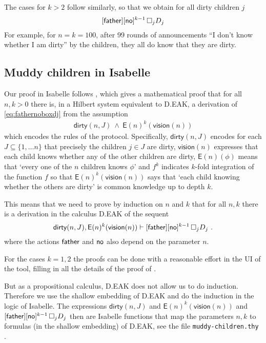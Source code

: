 \documentclass[runningheads,a4paper]{llncs}
\begin{document}
\medskip\noindent The cases for $k>2$ follow similarly, so that we obtain for all dirty children $j$
\begin{equation}\label{eq:fathernoboxdj}
[\textsf{father}][\textsf{no}]^{k-1}\,\Box_j D_j
 \end{equation}
For example, for $n=k=100$, after 99 rounds of announcements  ``I don't know whether I am dirty'' by the children, they all do know that they are dirty. 

\subsection{Muddy children in Isabelle}
Our proof in Isabelle follows \cite[Prop.24]{MaPS14}, which gives a mathematical proof that for all $n,k>0$ there is, in a Hilbert system equivalent to D.EAK, a derivation  of 
\eqref{eq:fathernoboxdj} from the assumption
\newcommand{\dirty}{\textsf{dirty}}
\newcommand{\E}{\textsf{E}}
\newcommand{\vision}{\textsf{vision}}
\begin{gather}\label{eq:mc-assumptions}
\dirty(n,J) \ \wedge \ \E(n)^k(\vision(n))
\end{gather}
which encodes the rules of the protocol. Specifically, $\dirty(n,J)$ encodes for each $J\subseteq\{1,\ldots n\}$ that precisely the children $j\in J$ are dirty, $\vision(n)$ expresses that each child knows whether any of the other children are dirty, 
$\E(n)(\phi)$ means that `every one of the $n$ children knows $\phi$' and $f^k$ indicates $k$-fold integration of the function $f$ so that $\E(n)^k(\vision(n))$ says that `each child knowing whether the others are dirty' is common knowledge up to depth $k$.

\medskip\noindent This means that we need to prove by induction on $n$ and $k$ that for  all $n,k$ there is a derivation in the calculus D.EAK of the sequent 
\begin{equation}\label{eq:mc}
 \dirty(n,J) , \E(n)^k(\vision(n))\vdash [\father][\no]^{k-1}\,\Box_j D_j \ .
 \end{equation}
where the actions $\textsf{father}$ and $\textsf{no}$ also depend on the parameter $n$.

\medskip\noindent For the cases $k=1,2$ the proofs can be done with a reasonable effort in the UI of the tool, filling in all the details of the proof of \cite{MaPS14}. 	

\medskip\noindent But as a propositional calculus, D.EAK does not allow us to do  induction. Therefore we use the shallow embedding of D.EAK  and do the induction in the logic of Isabelle. The expressions $\dirty(n,J)$ and $\E(n)^k(\vision(n))$ and $[\textsf{father}][\textsf{no}]^{k-1}\,\Box_j D_j$ then are Isabelle functions that map the parameters $n,k$ to formulas (in the shallow embedding) of D.EAK, see the file \texttt{muddy-children.thy} \cite{Balco:MC}.
\end{document}
